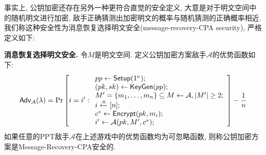 事实上, 公钥加密还存在另外一种更符合直觉的安全定义, 大意是对于明文空间中的随机明文进行加密, 
敌手正确猜测出加密明文的概率与随机猜测的正确概率相近. 我们称这种安全性为消息恢复选择明文安全(message-recovery-CPA security), 严格定义如下: 
\begin{trivlist}
\item \textbf{消息恢复选择明文安全.} 令$M$是明文空间. 定义公钥加密方案敌手$\mathcal{A}$的优势函数如下: 
\begin{displaymath}
    \mathsf{Adv}_\mathcal{A}(\lambda) =
    \Pr \left[ i = i':
    \begin{array}{l}
        pp \leftarrow \mathsf{Setup}(1^\kappa); \\
        (pk, sk) \leftarrow \mathsf{KeyGen}(pp);\\
        M' = \{m_1, \dots, m_n\} \subseteq M \leftarrow \mathcal{A}, |M'| \geq 2; \\ 
        i \xleftarrow{\textup{\tiny R}} [n];\\
        c^* \leftarrow \mathsf{Encrypt}(pk, m_i);\\
        i' \leftarrow \mathcal{A}(pk, M', c^*);
    \end{array} 
    \right] - \frac{1}{n}
\end{displaymath}
如果任意的PPT敌手$\mathcal{A}$在上述游戏中的优势函数均为可忽略函数, 则称公钥加密方案是Message-Recovery-CPA安全的.  
\end{trivlist}

